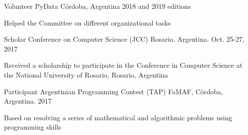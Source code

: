 \documentclass[10pt, a4paper]{resume}
\begin{document}
\begin{cventries}

    \cventry
    {Volunteer}
    {PyData}
    {Córdoba, Argentina}
    {2018 and 2019 editions}
    {
        \begin{cvitems}
        \item {Helped the Committee on different organizational tasks}
        \end{cvitems}
    }

    \cventry
    {Scholar}
    {Conference on Computer Science (JCC)}
    {Rosario, Argentina.}
    {Oct. 25-27, 2017}
    {
        \begin{cvitems}
        \item {Received a scholarship to participate in the Conference in Computer Science at the National University of Rosario, Rosario, Argentina}
        \end{cvitems}
    }

    \cventry
    {Participant}
    {Argentinian Programming Contest (TAP)}
    {FaMAF, Córdoba, Argentina.}
    {2017}
    {
        \begin{cvitems}
        \item {Based on resolving a series of mathematical and algorithmic problems using programming skills}
        \end{cvitems}
    }

\end{cventries}

\end{document}
